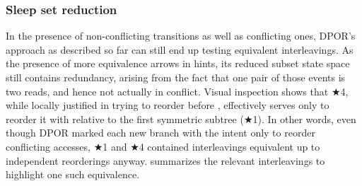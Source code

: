 \subsubsection{Sleep set reduction}
\label{sec:landslide-sleepsets}

In the presence of non-conflicting transitions as well as conflicting ones,
DPOR's approach as described so far can still end up testing equivalent interleavings.
As the presence of more equivalence arrows in  hints,
its reduced subset state space still contains redundancy,
arising from the fact that one pair of those  events is two reads, and hence not actually in conflict.
Visual inspection shows that $\bigstar$4, while locally justified
in trying to reorder  before ,
effectively serves %
only to reorder it with 
relative to the first symmetric subtree ($\bigstar$1).
In other words,
even though DPOR marked each new branch with the intent only to reorder conflicting accesses,
$\bigstar$1 and $\bigstar$4 contained interleavings equivalent up to independent reorderings anyway.
 summarizes the relevant interleavings to highlight one such equivalence.

